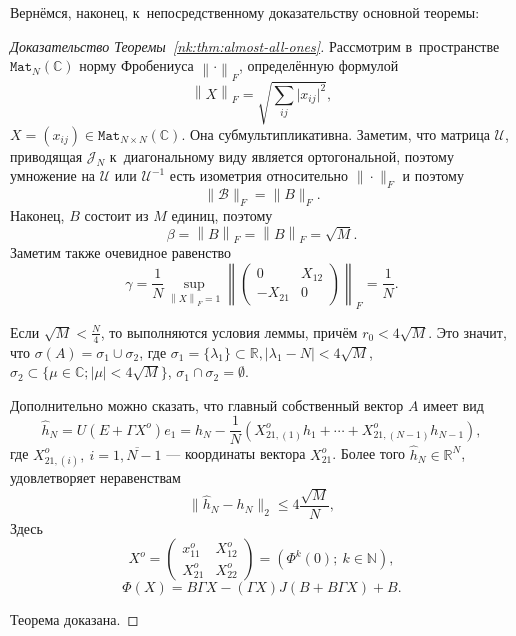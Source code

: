 \documentclass[14pt,a4paper]{extarticle}
\numberwithin{equation}{section}
\theoremstyle{definition}
\begin{document}
Верн\"емся, наконец, к~непосредственному доказательству основной теоремы:
\begin{proof}[Доказательство Теоремы~\ref{nk:thm:almost-all-ones}]
    Рассмотрим в~пространстве \( \mathtt{Mat}_{N}(\mathbb{C}) \)
    норму Фробениуса \( {\left\|\cdot\right\|}_{F} \),
    определ\"енную формулой
    \[ {\left\|X\right\|}_{F} = \sqrt{\sum_{ij} \lvert x_{ij}\rvert^2}, \]
    \( X = (x_{ij})\in\mathtt{Mat}_{N{\times}N}(\mathbb{C}) \).
    Она суб\-мульти\-пли\-кативна.
    Заметим, что матрица \( \mathcal{U} \),
    приводящая \( \mathcal{J}_N \) к~диагональному виду
    является ортогональной,
    поэтому умножение на \( \mathcal{U} \) или \(\mathcal{U}^{-1}\)
    есть изометрия относительно \( \|\cdot\|_F \) и поэтому
    \[ \|\mathcal{B}\|_F=\|B\|_F. \]
    Наконец,
    \( B \) состоит из \( M \) единиц, поэтому
    \[
        \beta = {\left\|B\right\|}_{F} =
        {\left\|B\right\|}_{F} = \sqrt{M}.
        \]
    Заметим также очевидное равенство
    \[
        \gamma = \frac1N
                \sup_{{\left\|X\right\|}_{F}=1}{\left\|\begin{pmatrix}0 & X_{12} \\ -X_{21} & 0\end{pmatrix}\right\|}_{F}
                = \frac1N. \]
    
    Если
     \( \sqrt{M} < \frac{N}{4} \),
     то выполняются условия леммы,
     прич\"ем \( r_0 < 4\sqrt{M} \).
    Это значит, что
     \( \sigma(A) = \sigma_1 \cup \sigma_2 \),
     где \( \sigma_1 = \{ \lambda_1 \}\subset\mathbb{R}, \lvert \lambda_1 - N \rvert < 4\sqrt{M} \),
     \( \sigma_2 \subset \{ \mu\in\mathbb{C}; \lvert\mu\rvert < 4\sqrt{M} \} \),
     \( \sigma_1 \cap \sigma_2 = \emptyset \).

Дополнительно можно сказать, что 
     главный собственный вектор \( A \) имеет вид
     \[
       \hat{h}_N = U(E+\Gamma X^o) e_1 =
       h_N - \frac1N (X_{21,(1)}^o h_1 + \cdots + X_{21, (N{-}1)}^o h_{N{-}1}),
     \]
     где \( X_{21,(i)}^o,\ i=\overline{1,N{-}1} \) --- координаты вектора
     \( X_{21}^o \).
     Более того \( \hat{h}_N\in\mathbb{R}^{N} \),
     удовлетворяет неравенствам
     \[
       \|\hat{h}_N - h_N\|_2 \leq 4\frac{\sqrt{M}}{N},
     \]
     Здесь
     \[ X^o =
       \begin{pmatrix}
         x_{11}^o & X_{12}^o \\
         X_{21}^o & X_{22}^o
       \end{pmatrix}
       = \left( \Phi^k(0);\ k\in\mathbb{N} \right), \]
     \[
       \Phi(X) = B\Gamma X - (\Gamma X)J(B + B\Gamma X) + B.
     \]
     
     Теорема доказана.
   \end{proof}
\end{document}
